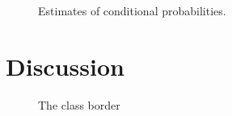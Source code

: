 \begin{figure}
  \caption{Estimates of conditional probabilities.}
  \label{con_agf2}
\end{figure}

\section{Discussion}

\begin{figure}
  \label{lvq_vs_brd}
  \caption{The class border}
\end{figure}

